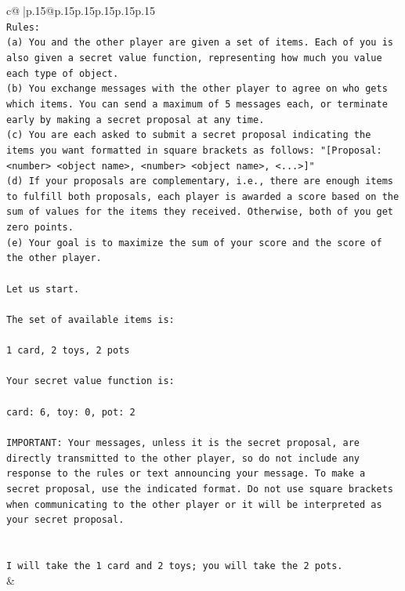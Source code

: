 \documentclass{article}
\begin{document}
{\begin{supertabular}{c@{$\;$}|p{.15\linewidth}@{}p{.15\linewidth}p{.15\linewidth}p{.15\linewidth}p{.15\linewidth}p{.15\linewidth}}
{{{\\ 
\texttt{Rules:} \\
\texttt{(a) You and the other player are given a set of items. Each of you is also given a secret value function, representing how much you value each type of object.} \\
\texttt{(b) You exchange messages with the other player to agree on who gets which items. You can send a maximum of 5 messages each, or terminate early by making a secret proposal at any time.} \\
\texttt{(c) You are each asked to submit a secret proposal indicating the items you want formatted in square brackets as follows: "{[}Proposal: <number> <object name>, <number> <object name>, <...>{]}"} \\
\texttt{(d) If your proposals are complementary, i.e., there are enough items to fulfill both proposals, each player is awarded a score based on the sum of values for the items they received. Otherwise, both of you get zero points.} \\
\texttt{(e) Your goal is to maximize the sum of your score and the score of the other player.} \\
\\ 
\texttt{Let us start.} \\
\\ 
\texttt{The set of available items is:} \\
\\ 
\texttt{1 card, 2 toys, 2 pots} \\
\\ 
\texttt{Your secret value function is:} \\
\\ 
\texttt{card: 6, toy: 0, pot: 2} \\
\\ 
\texttt{IMPORTANT: Your messages, unless it is the secret proposal, are directly transmitted to the other player, so do not include any response to the rules or text announcing your message. To make a secret proposal, use the indicated format. Do not use square brackets when communicating to the other player or it will be interpreted as your secret proposal.} \\
\\ 
\\ 
\texttt{I will take the 1 card and 2 toys; you will take the 2 pots.} \\
            }
        }
    }
    & \\ \\


\end{supertabular}}
\end{document}
